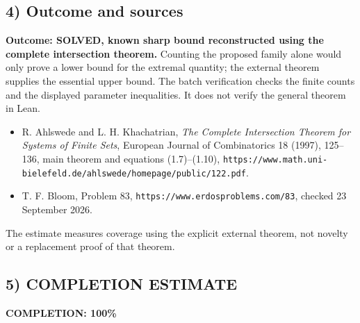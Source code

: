 \subsection{4) Outcome and sources}
\textbf{Outcome: SOLVED, known sharp bound reconstructed using the
complete intersection theorem.} Counting the proposed family alone
would only prove a lower bound for the extremal quantity; the
external theorem supplies the essential upper bound. The batch
verification checks the finite counts and the displayed parameter
inequalities. It does not verify the general theorem in Lean.

\begin{itemize}
\item R. Ahlswede and L. H. Khachatrian, \emph{The Complete
Intersection Theorem for Systems of Finite Sets}, European Journal
of Combinatorics 18 (1997), 125--136, main theorem and equations
(1.7)--(1.10),
\texttt{https://www.math.uni-bielefeld.de/ahlswede/homepage/public/122.pdf}.
\item T. F. Bloom, Problem 83,
\texttt{https://www.erdosproblems.com/83}, checked 23 September 2026.
\end{itemize}
The estimate measures coverage using the explicit external theorem,
not novelty or a replacement proof of that theorem.
\subsection{5) COMPLETION ESTIMATE}
\textbf{COMPLETION: 100\%}
